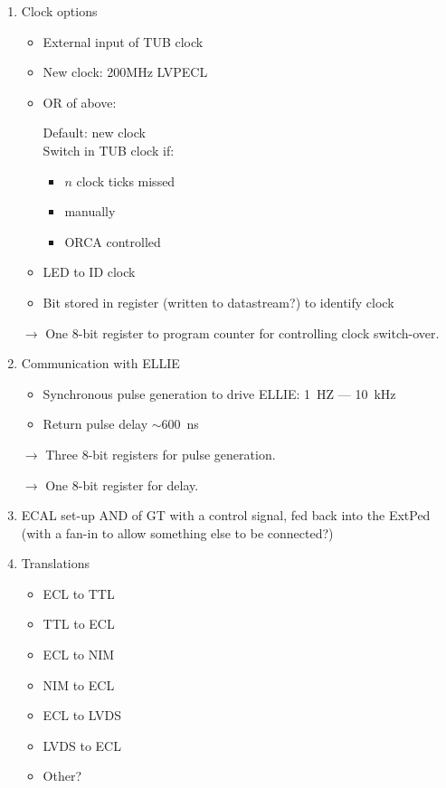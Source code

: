 \documentclass[letter, 11pt]{article}
\begin{document}
\begin{enumerate}
\item Clock options

\begin{itemize}
\item  External input of TUB clock
\item  New clock: 200MHz LVPECL
\item OR of above:

Default: new clock \\
Switch in TUB clock if:
\begin{itemize}
\item   $n$ clock ticks missed
\item manually
\item ORCA controlled
\end{itemize}

\item LED to ID clock
\item Bit stored in register (written to datastream?) to identify clock

\end{itemize}

$\rightarrow$ One 8-bit register to program counter for controlling clock switch-over.

\item Communication with ELLIE

\begin{itemize}
\item Synchronous pulse generation to drive ELLIE: 1~HZ --- 10~kHz
\item Return pulse delay $\sim$600~ns
\end{itemize}

$\rightarrow$ Three 8-bit registers for pulse generation.

$\rightarrow$ One 8-bit register for delay.

\item ECAL set-up
AND of GT with a control signal, fed back into the ExtPed (with a fan-in to allow something else to be connected?)

\item Translations

\begin{itemize}
\item ECL to TTL
\item TTL to ECL
\item ECL to NIM
\item NIM to ECL
\item ECL to LVDS
\item LVDS to ECL
\item Other?
\end{itemize}


\end{enumerate}
\end{document}
